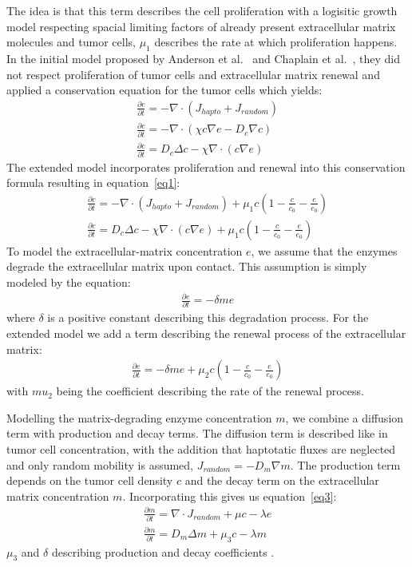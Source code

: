 The idea is that this term describes the cell proliferation with a logisitic growth model respecting spacial limiting factors of already present extracellular matrix molecules and tumor cells, $\mu_1$ describes the rate at which proliferation happens. In the initial model proposed by Anderson et al.~\cite{anderson_continuous_1998, anderson_mathematical_2000} and Chaplain et al.~\cite{anderson_continuous_1998,chaplain_mathematical_2006,chaplain_mathematical_2006-1,franssen_mathematical_2019}, they did not respect proliferation of tumor cells and extracellular matrix renewal and applied a conservation equation for the tumor cells which yields:
\begin{align*}
    \frac{\partial c}{\partial t} = -\nabla \cdot (J_{hapto} + J_{random}) \\
    \frac{\partial c}{\partial t} = -\nabla \cdot (\chi c \nabla e -D_c \nabla c ) \\
    \frac{\partial c}{\partial t} = D_c \Delta c - \chi \nabla \cdot (c\nabla e)
\end{align*}
The extended model incorporates proliferation and renewal into this conservation formula resulting in equation~\ref{eq1}:
\begin{align*}
    \frac{\partial c}{\partial t} = -\nabla \cdot (J_{hapto} + J_{random}) + \mu_1 c (1-\frac{c}{c_0} - \frac{e}{e_0}) \\
    \frac{\partial c}{\partial t} = D_c \Delta c - \chi \nabla \cdot (c\nabla e) + \mu_1 c (1-\frac{c}{c_0} - \frac{e}{e_0})
\end{align*}
To model the extracellular-matrix concentration $e$, we assume that the enzymes degrade the extracellular matrix upon contact. This assumption is simply modeled by the equation:
\begin{align*}
    \frac{\partial e}{\partial t} = -\delta m e
\end{align*}
where $\delta$ is a positive constant describing this degradation process. For the extended model we add a term describing the renewal process of the extracellular matrix: 
\begin{align*}
    \frac{\partial e}{\partial t} = -\delta m e + \mu_2 c (1 - \frac{c}{c_0} - \frac{e}{e_0})
\end{align*}
with $mu_2$ being the coefficient describing the rate of the renewal process.

Modelling the matrix-degrading enzyme concentration $m$, we combine a diffusion term with production and decay terms. The diffusion term is described like in tumor cell concentration, with the addition that haptotatic fluxes are neglected and only random mobility is assumed, $J_{random} = -D_m \nabla m$. The production term depends on the tumor cell density $c$ and the decay term on the extracellular matrix concentration $m$. Incorporating this gives us equation~\ref{eq3}:
\begin{align*}
    \frac{\partial m}{\partial t} = \nabla \cdot J_{random} + \mu c - \lambda e \\
    \frac{\partial m}{\partial t} = D_m \Delta m + \mu_3 c - \lambda m
\end{align*}
$\mu_3$ and $\delta$ describing production and decay coefficients .


